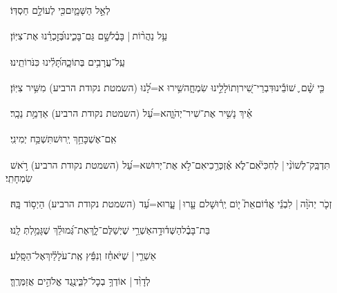 \documentclass[12pt]{article}
\newcommand{\loc}[1]{\textsuperscript{\locf{#1}}}
\begin{document}
{\loc{ כו}~}‏ לְאֵ֣ל הַשָּׁמָ֑יִם{\hfill}כִּ֖י לְעוֹלָ֣ם חַסְדּֽוֹ׃\par\pend
\ledpb
\pstart[\subsection*{\textcolor{red}{פרק קלז}}]\label{פרק קלז}
{\loc{ א}~}‏עַ֥ל נַהֲר֨וֹת |  בָּבֶ֗ל{\hfill}שָׁ֣ם \newline\hspace*{.5em}גַּם־בָּכִ֑ינוּ{\hfill}בְּ֝זׇכְרֵ֗נוּ אֶת־צִיּֽוֹן׃\par

{\loc{ ב}~}‏עַֽל־עֲרָבִ֥ים בְּתוֹכָ֑הּ{\hfill}תָּ֝לִ֗ינוּ כִּנֹּרוֹתֵֽינוּ׃\par

{\loc{ ג}~}‏כִּ֤י שָׁ֨ם ֪ שׁוֹבֵ֡ינוּ{\hfill}דִּבְרֵי־שִׁ֭יר\newline\hspace*{.5em}וְתוֹלָלֵ֣ינוּ שִׂמְחָ֑ה{\hfill}שִׁ֥ירוּ א=לָ֝נוּ (השמטת נקודת הרביע) מִשִּׁ֥יר צִיּֽוֹן׃\par

{\loc{ ד}~}‏אֵ֗יךְ נָשִׁ֥יר אֶת־שִׁיר־יְהֹוָ֑ה{\hfill}א=עַ֝ל (השמטת נקודת הרביע) אַדְמַ֥ת נֵכָֽר׃\par

{\loc{ ה}~}‏אִֽם־אֶשְׁכָּחֵ֥ךְ יְֽרוּשׁ{\hfill}תִּשְׁכַּ֥ח יְמִינִֽי׃\par

{\loc{ ו}~}‏תִּדְבַּֽק־לְשׁוֹנִ֨י |  לְחִכִּי֮{\hfill}אִם־לֹ֢א אֶ֫זְכְּרֵ֥כִי\newline\hspace*{.5em}אִם־לֹ֣א  אֶת־יְרוּשׁ{\hfill}א=עַ֝ל (השמטת נקודת הרביע) רֹ֣אשׁ שִׂמְחָתִֽי׃\par

{\loc{ ז}~}‏זְכֹ֤ר יְהֹוָ֨ה |  לִבְנֵ֬י אֱד֗וֹם{\hfill}אֵת֮ י֤וֹם יְֽר֫וּשָׁלם\newline\hspace*{.5em} עָ֤רוּ |  עָ֑רוּ{\hfill}א=עַ֝ד (השמטת נקודת הרביע) הַיְס֥וֹד בָּֽהּ׃\par

{\loc{ ח}~}‏בַּת־בָּבֶ֗ל{\hfill}הַשְּׁד֫וּדָ֥ה\newline\hspace*{.5em}אַשְׁרֵ֥י שֶׁיְשַׁלֶּם־לָ֑ךְ{\hfill}אֶת־גְּ֝מוּלֵ֗ךְ שֶׁגָּמַ֥לְתְּ לָֽנוּ׃\par

{\loc{ ט}~}‏אַשְׁרֵ֤י |  שֶׁיֹּאחֵ֓ז וְנִפֵּ֬ץ אֶֽת־עֹלָלַ֗יִךְ{\hfill}אֶל־הַסָּֽלַע׃\par\pend
\ledpb
\pstart[\subsection*{\textcolor{red}{פרק קלח}}]\label{פרק קלח}
{\loc{ א}~}‏לְדָוִ֨ד |  אוֹדְךָ֥ בְכׇל־לִבִּ֑י{\hfill}נֶ֖גֶד אֱלֹהִ֣ים אֲזַמְּרֶֽךָּ׃\par
\end{document}

